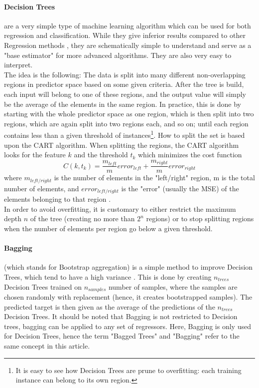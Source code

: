 \documentclass[11pt,a4paper,notitlepage]{article}
\begin{document}
\paragraph{Decision Trees} are a very simple type of machine learning algorithm which can be used for both regression and classification. While they give inferior results compared to other Regression methods \citep{MortenLectureNotes}, they are schematically simple to understand and serve as a "base estimator" for more advanced algorithms. They are also very easy to interpret. \\
The idea is the following: The data is split into many different non-overlapping regions in predictor space based on some given criteria. After the tree is build, each input will belong to one of these regions, and the output value will simply be the average of the elements in the same region. In practice, this is done by starting with the whole predictor space as one region, which is then split into two regions, which are again split into two regions each, and so on; until each region contains less than a given threshold of instances\footnote{It is easy to see how Decision Trees are prune to overfitting: each training instance can belong to its own region.}. How to split the set is based upon the CART algorithm. When splitting the regions, the CART algorithm looks for the feature $k$ and the threshold $t_k$ which minimizes the cost function 
\begin{equation}
    C(k,t_k)=\frac{m_{left}}{m}error_{left}+\frac{m_{right}}{m}error_{right}
\end{equation}
where $m_{left/right}$ is the number of elements in the "left/right" region, m is the total number of elements, and $error_{left/right}$ is the "error" (usually the MSE) of the elements belonging to that region \citep{handsOnMachineLearning}.\\
In order to avoid overfitting, it is customary to either restrict the maximum depth $n$ of the tree (creating no more than $2^n$ regions) or to stop splitting regions when the number of elements per region go below a given threshold.
\paragraph{Bagging} (which stands for Bootstrap aggregation) is a simple method to improve Decision Trees, which tend to have a high variance \citep{MortenLectureNotes}. This is done by creating $n_{trees}$ Decision Trees trained on $n_{samples}$ number of samples, where the samples are chosen randomly with replacement (hence, it creates bootstrapped samples). The predicted target is then given as the average of the predictions of the $n_{trees}$ Decision Trees. It should be noted that Bagging is not restricted to Decision trees, bagging can be applied to any set of regressors. Here, Bagging is only used for Decision Trees, hence the term "Bagged Trees" and "Bagging" refer to the same concept in this article.
\end{document}
